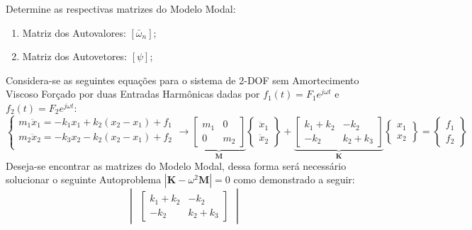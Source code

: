 \documentclass{article}
\begin{document}
\begin{exercise}\label{ex1}
    Determine as respectivas matrizes do Modelo Modal:
    \begin{enumerate}
        \item Matriz dos Autovalores: $[\bar{\omega}_n]$;
        \item Matriz dos Autovetores: $[\psi]$;
    \end{enumerate}
\end{exercise}
\begin{resolution}
    Considera-se as seguintes equações para o sistema de 2-DOF sem Amortecimento Viscoso Forçado por duas Entradas Harmônicas dadas por $f_1(t) = F_1 e^{j\omega t}$ e $f_2(t) = F_2 e^{j\omega t}$:
    \begin{equation*}
        \begin{cases}
            m_1 \ddot{x}_1 = -k_1 x_1 + k_2 (x_2 - x_1) + f_1\\
            m_2 \ddot{x}_2 = -k_3 x_2 - k_2 (x_2 - x_1) + f_2\\
        \end{cases}
        \to
        \underbrace{\begin{bmatrix} m_1 & 0\\ 0 & m_2\end{bmatrix}}_{\mathbf{M}} 
        \begin{Bmatrix} \ddot{x}_1\\ \ddot{x}_2\end{Bmatrix} + 
        \underbrace{\begin{bmatrix} k_1 + k_2 & -k_2\\ -k_2 & k_2 + k_3\end{bmatrix}}_{\mathbf{K}}
        \begin{Bmatrix} x_1\\ x_2\end{Bmatrix} =
        \begin{Bmatrix} f_1\\f_2\end{Bmatrix} 
    \end{equation*}
    Deseja-se encontrar as matrizes do Modelo Modal, dessa forma será necessário solucionar o seguinte Autoproblema $|\mathbf{K} - \omega^2\mathbf{M}| = 0$ como demonstrado a seguir:
    \begin{equation*}
        \begin{vmatrix}
            \begin{bmatrix} k_1 + k_2 & -k_2\\ -k_2 & k_2 + k_3\end{bmatrix} 

\end{vmatrix}
\end{equation*}
\end{resolution}
\end{document}
